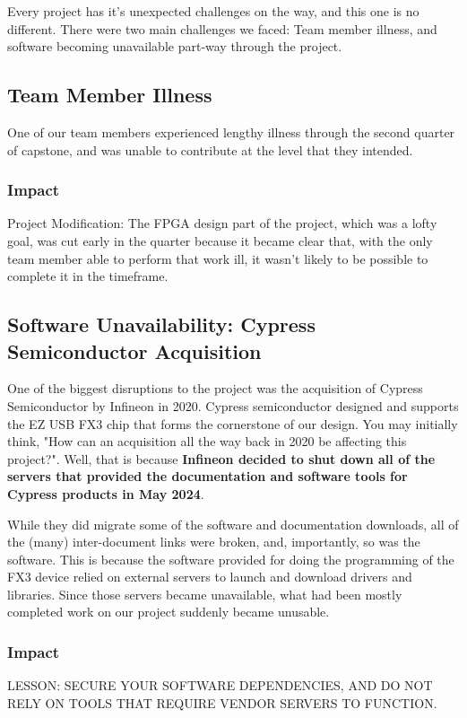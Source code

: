 Every project has it's unexpected challenges on the way, and this one is no different. There were two main challenges we faced: Team member illness, and software becoming unavailable part-way through the project.

\subsection{Team Member Illness}
One of our team members experienced lengthy illness through the second quarter of capstone, and was unable to contribute at the level that they intended.

\subsubsection{Impact}
Project Modification: The FPGA design part of the project, which was a lofty goal, was cut early in the quarter because it became clear that, with the only team member able to perform that work ill, it wasn't likely to be possible to complete it in the timeframe.

\subsection{Software Unavailability: Cypress Semiconductor Acquisition}
One of the biggest disruptions to the project was the acquisition of Cypress Semiconductor by Infineon in 2020. Cypress semiconductor designed and supports the EZ USB FX3 chip that forms the cornerstone of our design. You may initially think, "How can an acquisition all the way back in 2020 be affecting this project?". Well, that is because \textbf{Infineon decided to shut down all of the servers that provided the documentation and software tools for Cypress products in May 2024}. 

While they did migrate some of the software and documentation downloads, all of the (many) inter-document links were broken, and, importantly, so was the software. This is because the software provided for doing the programming of the FX3 device relied on external servers to launch and download drivers and libraries. Since those servers became unavailable, what had been mostly completed work on our project suddenly became unusable.

\subsubsection{Impact}
LESSON: SECURE YOUR SOFTWARE DEPENDENCIES, AND DO NOT RELY ON TOOLS THAT REQUIRE VENDOR SERVERS TO FUNCTION.


